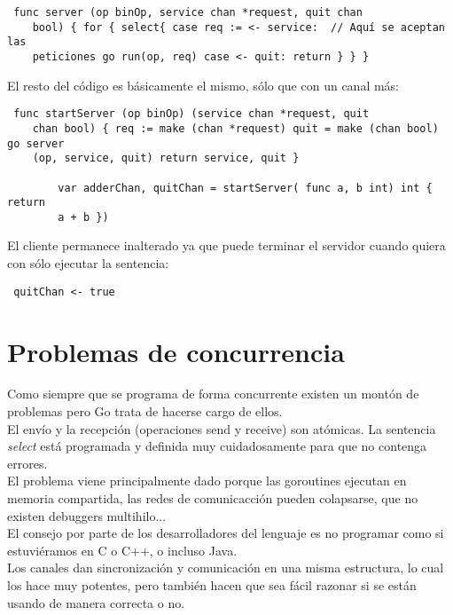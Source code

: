 	\begin{verbatim} func server (op binOp, service chan *request, quit chan
	bool) { for { select{ case req := <- service:  // Aquí se aceptan las
	peticiones go run(op, req) case <- quit: return } } } \end{verbatim}
	
	El resto del código es básicamente el mismo, sólo que con un canal más:
	
	\begin{verbatim} func startServer (op binOp) (service chan *request, quit
	chan bool) { req := make (chan *request) quit = make (chan bool) go server
	(op, service, quit) return service, quit }
	   
		var adderChan, quitChan = startServer( func a, b int) int { return
		a + b }) \end{verbatim}
	
	El cliente permanece inalterado ya que puede terminar el servidor cuando
	quiera con sólo ejecutar la sentencia:
	
	\begin{verbatim} quitChan <- true \end{verbatim}

\section{Problemas de concurrencia}

Como siempre que se programa de forma concurrente existen un montón de problemas
pero Go trata de hacerse cargo de ellos.\\

El envío y la recepción (operaciones send y receive) son atómicas. La sentencia
\textit{select} está programada y definida muy cuidadosamente para que no
contenga errores.\\

El problema viene principalmente dado porque las goroutines ejecutan en memoria
compartida, las redes de comunicacción pueden colapsarse, que no existen
debuggers multihilo...\\

El consejo por parte de los desarrolladores del lenguaje es no programar como si
estuviéramos en C o C++, o incluso Java.\\

Los canales dan sincronización y comunicación en una misma estructura, lo cual
los hace muy potentes, pero también hacen que sea fácil razonar si se están
usando de manera correcta o no.\\

